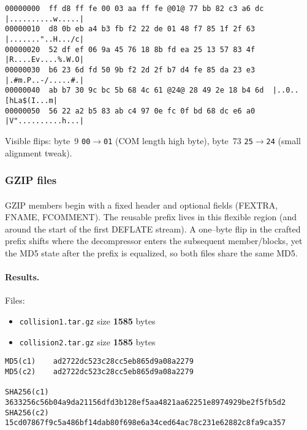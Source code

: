 \documentclass[runningheads]{llncs}
\begin{document}
    \begin{lstlisting}[style=hexhi,caption={collision1.jpg — first 96 bytes}]
00000000  ff d8 ff fe 00 03 aa ff fe @01@ 77 bb 82 c3 a6 dc  |..........w.....|
00000010  d8 0b eb a4 b3 fb f2 22 de 01 48 f7 85 1f 2f 63  |......."..H.../c|
00000020  52 df ef 06 9a 45 76 18 8b fd ea 25 13 57 83 4f  |R....Ev....%.W.O|
00000030  b6 23 6d fd 50 9b f2 2d 2f b7 d4 fe 85 da 23 e3  |.#m.P..-/.....#.|
00000040  ab b7 30 9c bc 5b 68 4c 61 @24@ 28 49 2e 18 b4 6d  |..0..[hLa$(I...m|
00000050  56 22 a2 b5 83 ab c4 97 0e fc 0f bd 68 dc e6 a0  |V"..........h...|
    \end{lstlisting}

    Visible flips: byte~9 \texttt{00$\rightarrow$01} (COM length high byte), byte~73 \texttt{25$\rightarrow$24} (small alignment tweak).

    \subsubsection{GZIP files}

    \paragraph{}
    GZIP members begin with a fixed header and optional fields (FEXTRA, FNAME, FCOMMENT). The reusable prefix lives in this flexible region (and around the start of the first DEFLATE stream). A one–byte flip in the crafted prefix shifts where the decompressor enters the subsequent member/blocks, yet the MD5 state after the prefix is equalized, so both files share the same MD5.

    \paragraph{Results.}
    Files:
    \begin{itemize}
        \item \texttt{collision1.tar.gz} size \textbf{1585} bytes
        \item \texttt{collision2.tar.gz} size \textbf{1585} bytes
    \end{itemize}

    \begin{lstlisting}[style=textblock, caption={Hashes for the reusable GZIP pair}, label={lst:gziphashes}]
MD5(c1)    ad2722dc523c28cc5eb865d9a08a2279
MD5(c2)    ad2722dc523c28cc5eb865d9a08a2279

SHA256(c1) 3633256c56b04a9da21156dfd3b128ef5aa4821aa62251e8974929be2f5fb5d2
SHA256(c2) 15cd07867f9c5a486bf14dab80f698e6a34ced64ac78c231e62882c8fa9ca357
    \end{lstlisting}
\end{document}
